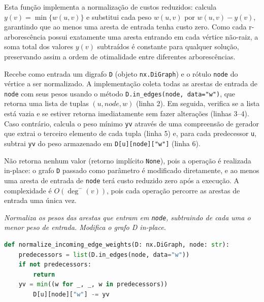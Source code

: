 Esta função implementa a normalização de custos reduzidos: calcula \(y(v)=\min\{w(u,v)\}\) e substitui cada peso \(w(u,v)\) por \(w(u,v)-y(v)\), garantindo que ao menos uma aresta de entrada tenha custo zero. Como cada r-arborescência possui exatamente uma aresta entrando em cada vértice não-raiz, a soma total dos valores \(y(v)\) subtraídos é constante para qualquer solução, preservando assim a ordem de otimalidade entre diferentes arborescências.

Recebe como entrada um digrafo \texttt{D} (objeto \texttt{nx.DiGraph}) e o rótulo \texttt{node} do vértice a ser normalizado. A implementação coleta todas as arestas de entrada de \texttt{node} com seus pesos usando o método \texttt{D.in\_edges(node, data="w")}, que retorna uma lista de tuplas \((u, node, w)\) (linha 2). Em seguida, verifica se a lista está vazia e se estiver retorna imediatamente sem fazer alterações (linhas 3--4). Caso contrário, calcula o peso mínimo \texttt{yv} através de uma compreensão de gerador que extrai o terceiro elemento de cada tupla (linha 5) e, para cada predecessor \texttt{u}, subtrai \texttt{yv} do peso armazenado em \texttt{D[u][node]["w"]} (linha 6).

Não retorna nenhum valor (retorno implícito \texttt{None}), pois a operação é realizada in-place: o grafo \texttt{D} passado como parâmetro é modificado diretamente, e ao menos uma aresta de entrada de \texttt{node} terá custo reduzido zero após a execução. A complexidade é \(O(\deg^-(v))\), pois cada operação percorre as arestas de entrada uma única vez.

\begin{tcolorbox}[
        enhanced, breakable,
        colframe=blue!60!black, colback=blue!2,
        colbacktitle=blue!15, coltitle=black,
        title={Normalização por vértice: custos reduzidos},
        boxed title style={sharp corners, boxrule=0.6pt},
        sharp corners, boxrule=0.6pt
    ]
    \emph{Normaliza os pesos das arestas que entram em \texttt{node}, subtraindo de cada uma o menor peso de entrada. Modifica o grafo D in-place.}
    \tcblower
    \begin{lstlisting}[language=Python]
def normalize_incoming_edge_weights(D: nx.DiGraph, node: str):    
    predecessors = list(D.in_edges(node, data="w"))
    if not predecessors:
        return
    yv = min((w for _, _, w in predecessors))
        D[u][node]["w"] -= yv   
\end{lstlisting}
\end{tcolorbox}

